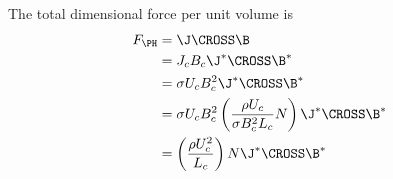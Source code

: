 \documentclass[11pt]{article}
\begin{document}
\doublespacing
\MOONSTITLE
\maketitle

The total dimensional force per unit volume is
\begin{equation}\begin{aligned}
F_{\PH} &= \J \CROSS \B \\
        &= J_c B_c \J^* \CROSS \B^* \\
        &= \sigma U_c B_c^2 \J^* \CROSS \B^* \\
        &= \sigma U_c B_c^2 \left(\frac{\rho U_c}{\sigma B_c^2 L_c} N \right) \J^* \CROSS \B^* \\
        &= \left(\frac{\rho U_c^2}{L_c} \right) N \J^* \CROSS \B^* \\
\end{aligned}\end{equation}
\end{document}
